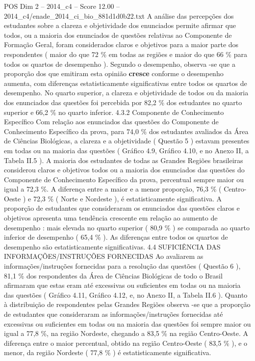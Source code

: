 \begin{textsample}{POS Dim 2 – 2014\_c4 – Score 12.00 – 2014\_c4/enade\_2014\_ci\_bio\_881d1d0b22.txt}
A análise das percepções dos estudantes sobre a clareza e objetividade dos enunciados permite afirmar que todos, ou a maioria dos enunciados de questões relativas ao Componente de Formação Geral, foram considerados claros e objetivos para a maior parte dos respondentes ( maior do que 72 \% em todas as regiões e maior do que 66 \% para todos os quartos de desempenho ).
Segundo o desempenho, observa -se que a proporção dos que emitiram esta opinião \textbf{cresce} conforme o desempenho aumenta, com diferenças estatisticamente significativas entre todos os quartos de desempenho.
No quarto superior, a clareza e objetividade de todos ou da maioria dos enunciados das questões foi percebida por 82,2 \% dos estudantes no quarto superior e 66,2 \% no quarto inferior. 4.3.2 Componente de Conhecimento Específico Com relação aos enunciados das questões do Componente de Conhecimento Específico da prova, para 74,0 \% dos estudantes avaliados da Área de Ciências Biológicas, a clareza e a objetividade ( Questão 5 ) estavam presentes em todas ou na maioria das questões ( Gráfico 4.9, Gráfico 4.10, e no Anexo II, a Tabela II.5 ).
A maioria dos estudantes de todas as Grandes Regiões brasileiras considerou claros e objetivos todos ou a maioria dos enunciados das questões do Componente de Conhecimento Específico da prova, percentual sempre maior ou igual a 72,3 \%.
A diferença entre a maior e a menor proporção, 76,3 \% ( Centro-Oeste ) e 72,3 \% ( Norte e Nordeste ), é estatisticamente significativa.
A proporção de estudantes que consideraram os enunciados das questões claros e objetivos apresenta uma tendência crescente em relação ao aumento de desempenho : mais elevada no quarto superior ( 80,9 \% ) se comparada ao quarto inferior de desempenho ( 65,4 \% ).
As diferenças entre todos os quartos de desempenho são estatisticamente significativas. 4.4 SUFICIÊNCIA DAS INFORMAÇÕES/INSTRUÇÕES FORNECIDAS Ao avaliarem as informações/instruções fornecidas para a resolução das questões ( Questão 6 ), 81,1 \% dos respondentes da Área de Ciências Biológicas de todo o Brasil afirmaram que estas eram até excessivas ou suficientes em todas ou na maioria das questões ( Gráfico 4.11, Gráfico 4.12, e, no Anexo II, a Tabela II.6 ).
Quanto à distribuição de respondentes pelas Grandes Regiões observa -se que a proporção de estudantes que consideraram as informações/instruções fornecidas até excessivas ou suficientes em todas ou na maioria das questões foi sempre maior ou igual a 77,8 \%, na região Nordeste, chegando a 83,5 \% na região Centro-Oeste.
A diferença entre o maior percentual, obtido na região Centro-Oeste ( 83,5 \% ), e o menor, da região Nordeste ( 77,8 \% ) é estatisticamente significativa.

\end{textsample}
